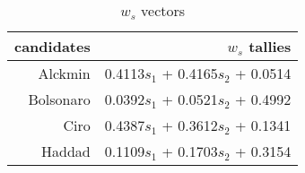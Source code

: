\begin{table}[H]
  \centering
  \begin{tabular}{rr}
    \hline
    candidates & \(w_{s}\) tallies} \\\hline
    Alckmin & 0.4113\(s_{1}\) + 0.4165\(s_2\) + 0.0514 \\
    Bolsonaro & 0.0392\(s_{1}\) + 0.0521\(s_2\) + 0.4992 \\
    Ciro & 0.4387\(s_{1}\) + 0.3612\(s_2\) + 0.1341 \\
    Haddad & 0.1109\(s_{1}\) + 0.1703\(s_2\) + 0.3154 \\\hline\hline
  \end{tabular}
  \caption{\(w_{s}\) vectors}\label{tbl:ws}
\end{table}
